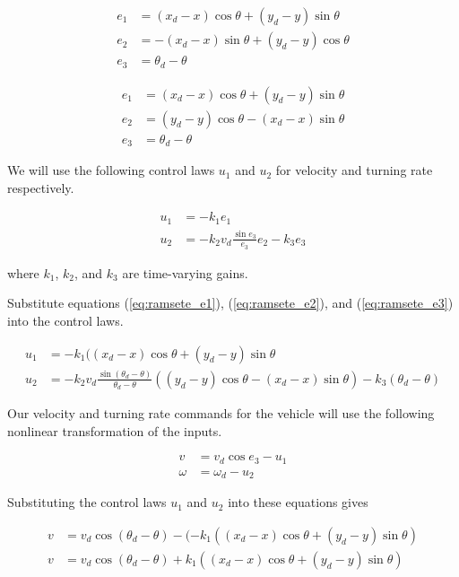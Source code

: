 \begin{align*}
  e_1 &= (x_d - x) \cos\theta + (y_d - y) \sin\theta \\
  e_2 &= -(x_d - x) \sin\theta + (y_d - y) \cos\theta \\
  e_3 &= \theta_d - \theta
\end{align*}

\begin{align}
  e_1 &= (x_d - x) \cos\theta + (y_d - y) \sin\theta \label{eq:ramsete_e1} \\
  e_2 &= (y_d - y) \cos\theta - (x_d - x) \sin\theta \label{eq:ramsete_e2} \\
  e_3 &= \theta_d - \theta \label{eq:ramsete_e3}
\end{align}

We will use the following control laws $u_1$ and $u_2$ for velocity and turning
rate respectively.

\begin{align*}
  u_1 &= -k_1 e_1 \\
  u_2 &= -k_2 v_d \frac{\sin{e_3}}{e_3} e_2 - k_3 e_3
\end{align*}

where $k_1$, $k_2$, and $k_3$ are time-varying gains.

Substitute equations (\ref{eq:ramsete_e1}), (\ref{eq:ramsete_e2}), and
(\ref{eq:ramsete_e3}) into the control laws.

\begin{align*}
  u_1 &= -k_1 ((x_d - x) \cos\theta + (y_d - y) \sin\theta \\
  u_2 &= -k_2 v_d \frac{\sin(\theta_d - \theta)}{\theta_d - \theta}
    ((y_d - y) \cos\theta - (x_d - x) \sin\theta) - k_3 (\theta_d - \theta)
\end{align*}

Our velocity and turning rate commands for the vehicle will use the following
nonlinear transformation of the inputs.

\begin{align*}
  v &= v_d\cos e_3 - u_1 \\
  \omega &= \omega_d - u_2
\end{align*}

Substituting the control laws $u_1$ and $u_2$ into these equations gives

\begin{align*}
  v &= v_d\cos(\theta_d - \theta) -
    (-k_1 ((x_d - x) \cos\theta + (y_d - y) \sin\theta) \\
  v &= v_d\cos(\theta_d - \theta) +
    k_1 ((x_d - x) \cos\theta + (y_d - y) \sin\theta) \\
\end{align*}

